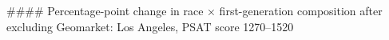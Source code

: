 #### Percentage-point change in race × first-generation composition after excluding Geomarket: Los Angeles, PSAT score 1270–1520
